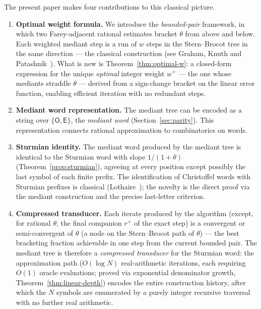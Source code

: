 \documentclass[12pt]{article}
\theoremstyle{definition}
\theoremstyle{remark}
\theoremstyle{plain}
\newcommand{\OO}{\mathsf{O}}
\newcommand{\EE}{\mathsf{E}}
\newcommand{\wplus}{w^{+}}
\begin{document}
The present paper makes four contributions to this classical picture.
\begin{enumerate}
  \item \textbf{Optimal weight formula.}
    We introduce the \emph{bounded-pair} framework, in which two Farey-adjacent rational
    estimates bracket $\theta$ from above and below.
    Each weighted mediant step is a run of $w$ steps in the Stern--Brocot tree in the
    same direction --- the classical construction (see Graham, Knuth and
    Patashnik~\cite{gkp1994}).
    What is new is Theorem~\ref{thm:optimal-w}: a closed-form expression for the unique
    \emph{optimal} integer weight $\wplus$ --- the one whose mediants straddle $\theta$
    --- derived from a sign-change bracket on the linear error function, enabling
    efficient iteration with no redundant steps.
  \item \textbf{Mediant word representation.}
    The mediant tree can be encoded as a string over $\{\OO, \EE\}$, the
    \emph{mediant word} (Section~\ref{sec:parity}).
    This representation connects rational approximation to combinatorics on words.
  \item \textbf{Sturmian identity.}
    The mediant word produced by the mediant tree is identical to the
    Sturmian word with slope $1/(1+\theta)$
    (Theorem~\ref{prop:sturmian}), agreeing at every position except possibly the last
    symbol of each finite prefix.
    The identification of Christoffel words with Sturmian prefixes is classical
    (Lothaire~\cite{lothaire2002}); the novelty is the direct proof via the mediant
    construction and the precise last-letter criterion.
  \item \textbf{Compressed transducer.}
    Each iterate produced by the algorithm (except, for rational $\theta$, the final
    companion $r^+$ of the exact step) is a convergent or semi-convergent of $\theta$
    (a node on the Stern--Brocot path of $\theta$) --- the
    best bracketing fraction achievable in one step from the current bounded pair.
    The mediant tree is therefore a \emph{compressed transducer} for the Sturmian word:
    the approximation path ($O(\log N)$ real-arithmetic iterations, each requiring $O(1)$ oracle
    evaluations; proved via exponential denominator growth,
    Theorem~\ref{thm:linear-depth})
    encodes the entire construction history, after which the $N$
    symbols are enumerated by a purely integer recursive traversal with no further
    real arithmetic.
\end{enumerate}
\end{document}
